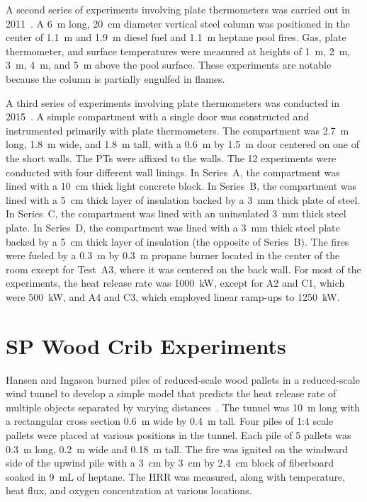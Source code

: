 A second series of experiments involving plate thermometers was carried out in 2011~\cite{Sjostrom:AST}. A 6~m long, 20~cm diameter vertical steel column was positioned in the center of 1.1~m and 1.9~m diesel fuel and 1.1~m heptane pool fires. Gas, plate thermometer, and surface temperatures were measured at heights of 1~m, 2~m, 3~m, 4~m, and 5~m above the pool surface. These experiments are notable because the column is partially engulfed in flames.

A third series of experiments involving plate thermometers was conducted in 2015~\cite{Sjostrom:SP2016}. A simple compartment with a single door was constructed and instrumented primarily with plate thermometers. The compartment was 2.7~m long, 1.8~m wide, and 1.8~m tall, with a 0.6~m by 1.5~m door centered on one of the short walls. The PTs were affixed to the walls. The 12 experiments were conducted with four different wall linings. In Series~A, the compartment was lined with a 10~cm thick light concrete block. In Series~B, the compartment was lined with a 5~cm thick layer of insulation backed by a 3~mm thick plate of steel. In Series~C, the compartment was lined with an uninsulated 3~mm thick steel plate. In Series~D, the compartment was lined with a 3~mm thick steel plate backed by a 5~cm thick layer of insulation (the opposite of Series~B). The fires were fueled by a 0.3~m by 0.3~m propane burner located in the center of the room except for Test~A3, where it was centered on the back wall. For most of the experiments, the heat release rate was 1000~kW, except for A2 and C1, which were 500~kW, and A4 and C3, which employed linear ramp-ups to 1250~kW.


\section{SP Wood Crib Experiments}
\label{SP_Wood_Cribs_Description}

Hansen and Ingason burned piles of reduced-scale wood pallets in a reduced-scale wind tunnel to develop a simple model that predicts the heat release rate of multiple objects separated by varying distances~\cite{Hansen:2010,Hansen:FSJ2012}. The tunnel was 10~m long with a rectangular cross section 0.6~m wide by 0.4~m tall. Four piles of 1:4 scale pallets were placed at various positions in the tunnel. Each pile of 5 pallets was 0.3~m long, 0.2~m wide and 0.18~m tall. The fire was ignited on the windward side of the upwind pile with a 3~cm by 3~cm by 2.4~cm block of fiberboard soaked in 9~mL of heptane. The HRR was measured, along with temperature, heat flux, and oxygen concentration at various locations.

